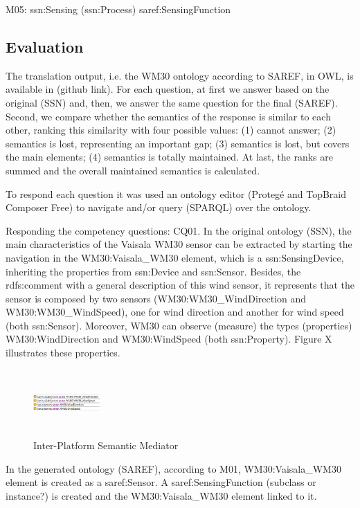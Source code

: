 \documentclass{sig-alternate-05-2015}
\begin{document}
M05: ssn:Sensing (ssn:Process)
saref:SensingFunction

\subsection{Evaluation}
The translation output, i.e. the WM30 ontology according to SAREF, in OWL, is available in (github link). For each question, at first we answer based on the original (SSN) and, then, we answer the same question for the final (SAREF). Second, we compare whether the semantics of the response is similar to each other, ranking this similarity with four possible values: (1) cannot answer; (2) semantics is lost, representing an important gap; (3) semantics is lost, but covers the main elements; (4) semantics is totally maintained. At last, the ranks are summed and the overall maintained semantics is calculated.

To respond each question it was used an ontology editor (Protegé and TopBraid Composer Free) to navigate and/or query (SPARQL) over the ontology. 

Responding the competency questions:
CQ01. In the original ontology (SSN), the main characteristics of the Vaisala WM30 sensor can be extracted by starting the navigation in the WM30:Vaisala\_WM30 element, which is a ssn:SensingDevice, inheriting the properties from ssn:Device and ssn:Sensor. Besides, the rdfs:comment with a general description of this wind sensor, it represents that the sensor is composed by two sensors (WM30:WM30\_WindDirection and WM30:WM30\_WindSpeed), one for wind direction and another for wind speed (both ssn:Sensor). Moreover, WM30 can observe (measure) the types (properties) WM30:WindDirection and WM30:WindSpeed (both ssn:Property). Figure X illustrates these properties.

\begin{figure}
\centering
\includegraphics[height=1in, width=1in]{SSN_SystemProperties}
\caption{Inter-Platform Semantic Mediator}
\end{figure}

In the generated ontology (SAREF), according to M01, WM30:Vaisala\_WM30 element is created as a saref:Sensor. A saref:SensingFunction (subclass or instance?) is created and the WM30:Vaisala\_WM30 element linked to it. 
\end{document}
